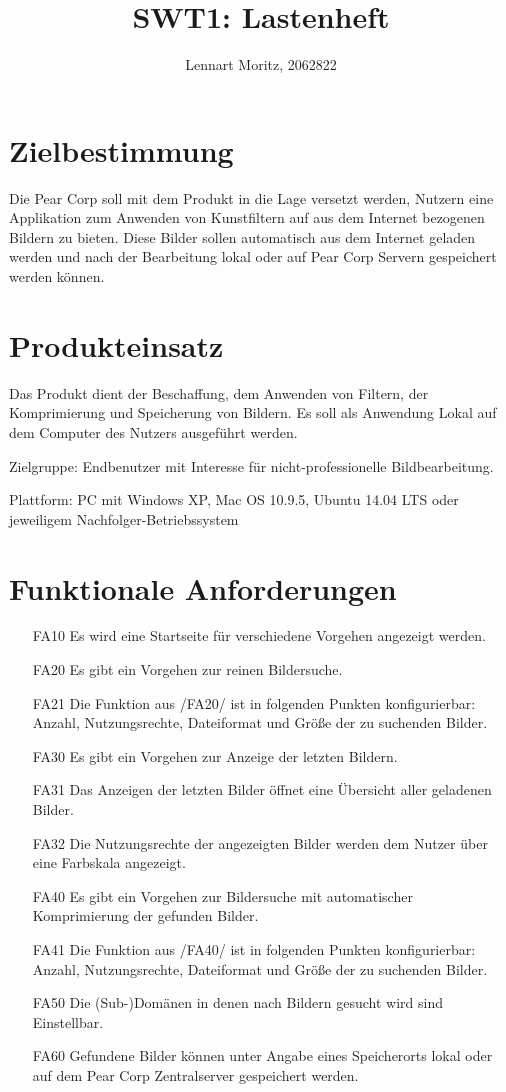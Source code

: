 \documentclass[parskip=full]{scrartcl}
\title{SWT1: Lastenheft}
\author{Lennart Moritz, 2062822}
\begin{document}
\maketitle

\section{Zielbestimmung}
Die Pear Corp soll mit dem Produkt in die Lage versetzt werden, Nutzern eine Applikation zum Anwenden von Kunstfiltern auf aus dem Internet bezogenen Bildern zu bieten. Diese Bilder sollen automatisch aus dem Internet geladen werden und nach der Bearbeitung lokal oder auf Pear Corp Servern gespeichert werden können.

\section{Produkteinsatz}

Das Produkt dient der Beschaffung, dem Anwenden von Filtern, der Komprimierung und Speicherung von Bildern. Es soll als Anwendung Lokal auf dem \gls{Computer} des Nutzers ausgeführt werden.

Zielgruppe: Endbenutzer mit Interesse für nicht-professionelle Bildbearbeitung.

Plattform: PC mit Windows XP, Mac OS 10.9.5, Ubuntu 14.04 LTS oder jeweiligem Nachfolger-Betriebssystem

\section{Funktionale Anforderungen}
\begin{itemize}[nosep]
\item[FA10] Es wird eine Startseite für verschiedene Vorgehen angezeigt werden.
\item[FA20] Es gibt ein Vorgehen zur reinen Bildersuche.
	\item[FA21] Die Funktion aus /FA20/ ist in folgenden Punkten konfigurierbar: 
	Anzahl, Nutzungsrechte, Dateiformat und Größe der zu suchenden Bilder.
\item[FA30] Es gibt ein Vorgehen zur Anzeige der letzten Bildern.
	\item[FA31] Das Anzeigen der letzten Bilder öffnet eine Übersicht aller geladenen Bilder.
	\item[FA32] Die Nutzungsrechte der angezeigten Bilder werden dem Nutzer über eine Farbskala angezeigt.
\item[FA40] Es gibt ein Vorgehen zur Bildersuche mit automatischer Komprimierung der gefunden Bilder.
	\item[FA41] Die Funktion aus /FA40/ ist in folgenden Punkten konfigurierbar: 
	Anzahl, Nutzungsrechte, Dateiformat und Größe der zu suchenden Bilder.
\item[FA50] Die (Sub-)Domänen in denen nach Bildern gesucht wird sind Einstellbar.
\item[FA60] Gefundene Bilder können unter Angabe eines Speicherorts lokal oder auf dem Pear Corp Zentralserver gespeichert werden.
\end{itemize}
\end{document}
